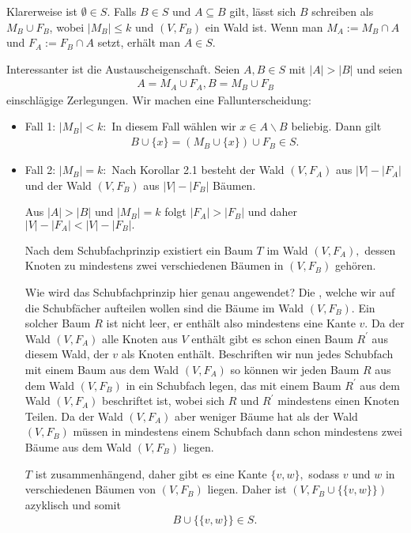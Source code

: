 \begin{solution}

  Klarerweise ist $\emptyset \in S.$ Falls $B \in S$ und $A \subseteq B$ gilt, lässt sich $B$ schreiben als $M_B \cup F_B$, wobei $|M_B| \leq k$ und $(V, F_B)$ ein Wald ist. Wenn man $M_A := M_B \cap A$ und $F_A := F_B \cap A$ setzt, erhält man $A \in S$.

  Interessanter ist die Austauscheigenschaft. Seien $A, B \in S$ mit $|A| > |B|$ und seien
  \begin{align*}
      A = M_A \cup F_A, B = M_B \cup F_B
  \end{align*}
  einschlägige Zerlegungen.
  Wir machen eine Fallunterscheidung:
  \begin{itemize}
      \item Fall 1: $|M_B| < k:$ In diesem Fall wählen wir $x \in A\backslash B$ beliebig. Dann gilt
      \begin{align*}
      B \cup \{x\} = (M_B \cup \{x\}) \cup F_B \in S.
      \end{align*}
      \item Fall 2: $|M_B| = k:$ Nach Korollar 2.1 besteht der Wald $(V, F_A)$ aus $|V| - |F_A|$ und der Wald $(V, F_B)$ aus $|V| - |F_B|$ Bäumen.

      Aus $|A| > |B|$ und $|M_B| = k$ folgt $|F_A| > |F_B|$ und daher $|V| - |F_A| < |V| - |F_B|.$

      Nach dem Schubfachprinzip existiert ein Baum $T$ im Wald $(V, F_A),$ dessen Knoten zu mindestens zwei verschiedenen Bäumen in $(V, F_B)$ gehören.
      
      Wie wird das Schubfachprinzip hier genau angewendet? Die , welche wir auf die Schubfächer aufteilen wollen sind die Bäume im Wald $(V,F_B)$. Ein solcher Baum $R$ ist nicht leer, er enthält also mindestens eine Kante $v$. Da der Wald $(V,F_A)$ alle Knoten aus $V$ enthält gibt es schon einen Baum $R^\prime$ aus diesem Wald, der $v$ als Knoten enthält. Beschriften wir nun jedes Schubfach mit einem Baum aus dem Wald $(V,F_A)$ so können wir jeden Baum $R$ aus dem Wald $(V,F_B)$ in ein Schubfach legen, das mit einem Baum $R^\prime$ aus dem Wald $(V,F_A)$ beschriftet ist, wobei sich $R$ und $R^\prime$ mindestens einen Knoten Teilen. Da der Wald $(V,F_A)$ aber weniger Bäume hat als der Wald $(V,F_B)$ müssen in mindestens einem Schubfach dann schon mindestens zwei Bäume aus dem Wald $(V,F_B)$ liegen.

      $T$ ist zusammenhängend, daher gibt es eine Kante $\{v, w\},$ sodass $v$ und $w$ in verschiedenen Bäumen von $(V, F_B)$ liegen. Daher ist $(V, F_B \cup \{\{v, w\}\})$ azyklisch und somit
      \begin{align*}
          B \cup \{\{v, w\}\} \in S.
      \end{align*}
  \end{itemize}
\end{solution}

